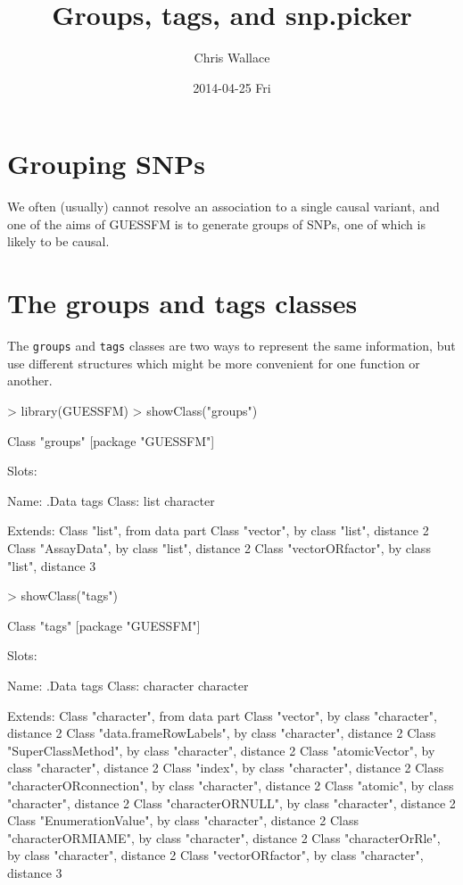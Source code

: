 \documentclass[11pt]{article}
\author{Chris Wallace}
\date{2014-04-25 Fri}
\title{Groups, tags, and snp.picker}
\begin{document}
\maketitle
\tableofcontents


\section{Grouping SNPs}
\label{sec-1}

We often (usually) cannot resolve an association to a single causal
variant, and one of the aims of GUESSFM is to generate groups of SNPs,
one of which is likely to be causal.

\section{The groups and tags classes}
\label{sec-2}
The \texttt{groups} and \texttt{tags} classes are two ways to represent the same
information, but use different structures which might be more
convenient for one function or another.

\begin{Schunk}
\begin{Sinput}
> library(GUESSFM)
> showClass("groups")
\end{Sinput}
\begin{Soutput}
Class "groups" [package "GUESSFM"]

Slots:
                          
Name:      .Data      tags
Class:      list character

Extends: 
Class "list", from data part
Class "vector", by class "list", distance 2
Class "AssayData", by class "list", distance 2
Class "vectorORfactor", by class "list", distance 3
\end{Soutput}
\begin{Sinput}
> showClass("tags")
\end{Sinput}
\begin{Soutput}
Class "tags" [package "GUESSFM"]

Slots:
                          
Name:      .Data      tags
Class: character character

Extends: 
Class "character", from data part
Class "vector", by class "character", distance 2
Class "data.frameRowLabels", by class "character", distance 2
Class "SuperClassMethod", by class "character", distance 2
Class "atomicVector", by class "character", distance 2
Class "index", by class "character", distance 2
Class "characterORconnection", by class "character", distance 2
Class "atomic", by class "character", distance 2
Class "characterORNULL", by class "character", distance 2
Class "EnumerationValue", by class "character", distance 2
Class "characterORMIAME", by class "character", distance 2
Class "characterOrRle", by class "character", distance 2
Class "vectorORfactor", by class "character", distance 3
\end{Soutput}
\end{Schunk}
\end{document}
